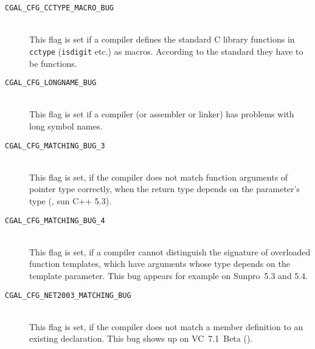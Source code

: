 \begin{description}
\item[{\tt CGAL\_CFG\_CCTYPE\_MACRO\_BUG}]~\\
 This flag is set if a compiler defines the standard C library
 functions in {\tt cctype} ({\tt isdigit} etc.) as macros.  According
 to the standard they have to be functions.
 
\item[{\tt CGAL\_CFG\_LONGNAME\_BUG}]~\\
 This flag is set if a compiler (or assembler or linker) has problems 
 with long symbol names. 

\item[{\tt CGAL\_CFG\_MATCHING\_BUG\_3}]~\\
 This flag is set, if the compiler does not match function arguments
 of pointer type correctly, when the return type depends on the
 parameter's type (\eg, sun C++ 5.3).

\item[{\tt CGAL\_CFG\_MATCHING\_BUG\_4}]~\\
 This flag is set, if a compiler cannot distinguish the signature of
 overloaded function templates, which have arguments whose type
 depends on the template parameter.  This bug appears for example on
 Sunpro~5.3 and 5.4.

\item[{\tt CGAL\_CFG\_NET2003\_MATCHING\_BUG}]~\\
 This flag is set, if the compiler does not match a member definition
 to an existing declaration. This bug shows up on VC~7.1~Beta
 ().


\end{description}
